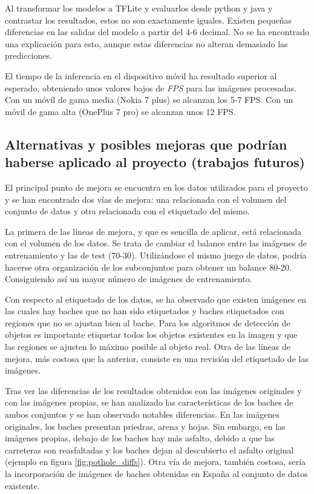 Al transformar los modelos a TFLite y evaluarlos desde python y java y contrastar los resultados, estos no son exactamente iguales. Existen pequeñas diferencias en las salidas del modelo a partir del 4-6 decimal. No se ha encontrado una explicación para esto, aunque estas diferencias no alteran demasiado las predicciones.

El tiempo de la inferencia en el dispositivo móvil ha resultado superior al esperado, obteniendo unos valores bajos de \textit{FPS} para las imágenes procesadas. Con un móvil de gama media (Nokia 7 plus) se alcanzan los 5-7 FPS. Con un móvil de gama alta (OnePlus 7 pro) se alcanzan unos 12 FPS.

\subsection{Alternativas y posibles mejoras que podrían haberse aplicado al proyecto (trabajos futuros)}

El principal punto de mejora se encuentra en los datos utilizados para el proyecto y se han encontrado dos vías de mejora: una relacionada con el volumen del conjunto de datos y otra relacionada con el etiquetado del mismo.

La primera de las líneas de mejora, y que es sencilla de aplicar, está relacionada con el volumen de los datos. Se trata de cambiar el balance entre las imágenes de entrenamiento y las de test (70-30). Utilizándose el mismo juego de datos, podría hacerse otra organización de los subconjuntos para obtener un balance 80-20. Consiguiendo así un mayor número de imágenes de entrenamiento.

Con respecto al etiquetado de los datos, se ha observado que existen imágenes en las cuales hay baches que no han sido etiquetados y baches etiquetados con regiones que no se ajustan bien al bache. Para los algoritmos de detección de objetos es importante etiquetar todos los objetos existentes en la imagen y que las regiones se ajusten lo máximo posible al objeto real. Otra de las líneas de mejora, más costosa que la anterior, consiste en una revisión del etiquetado de las imágenes.

Tras ver las diferencias de los resultados obtenidos con las imágenes originales y con las imágenes propias, se han analizado las características de los baches de ambos conjuntos y se han observado notables diferencias. En las imágenes originales, los baches presentan priedras, arena y hojas. Sin embargo, en las imágenes propias, debajo de los baches hay más asfalto, debido a que las carreteras son reasfaltadas y los baches dejan al descubierto el asfalto original (ejemplo en figura \ref{fig:pothole_diffs}). Otra vía de mejora, también costosa, sería la incorporación de imágenes de baches obtenidas en España al conjunto de datos existente.

